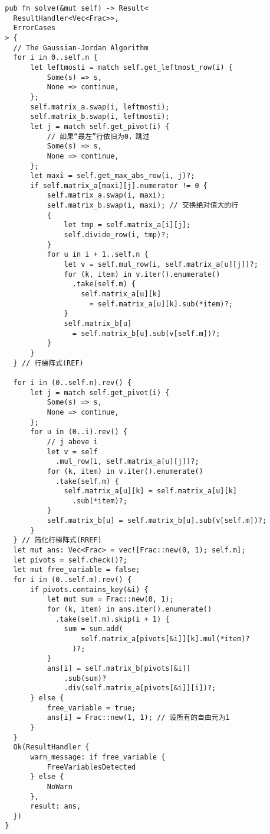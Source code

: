 \documentclass[1pt]{article}
\begin{document}
        \begin{lstlisting}
        pub fn solve(&mut self) -> Result<
          ResultHandler<Vec<Frac>>,
          ErrorCases
        > {
          // The Gaussian-Jordan Algorithm
          for i in 0..self.n {
              let leftmosti = match self.get_leftmost_row(i) {
                  Some(s) => s,
                  None => continue,
              };
              self.matrix_a.swap(i, leftmosti);
              self.matrix_b.swap(i, leftmosti);
              let j = match self.get_pivot(i) {
                  // 如果“最左”行依旧为0，跳过
                  Some(s) => s,
                  None => continue,
              };
              let maxi = self.get_max_abs_row(i, j)?;
              if self.matrix_a[maxi][j].numerator != 0 {
                  self.matrix_a.swap(i, maxi);
                  self.matrix_b.swap(i, maxi); // 交换绝对值大的行
                  {
                      let tmp = self.matrix_a[i][j];
                      self.divide_row(i, tmp)?;
                  }
                  for u in i + 1..self.n {
                      let v = self.mul_row(i, self.matrix_a[u][j])?;
                      for (k, item) in v.iter().enumerate()
                        .take(self.m) {
                          self.matrix_a[u][k]
                            = self.matrix_a[u][k].sub(*item)?;
                      }
                      self.matrix_b[u]
                        = self.matrix_b[u].sub(v[self.m])?;
                  }
              }
          } // 行梯阵式(REF)

          for i in (0..self.n).rev() {
              let j = match self.get_pivot(i) {
                  Some(s) => s,
                  None => continue,
              };
              for u in (0..i).rev() {
                  // j above i
                  let v = self
                    .mul_row(i, self.matrix_a[u][j])?;
                  for (k, item) in v.iter().enumerate()
                    .take(self.m) {
                      self.matrix_a[u][k] = self.matrix_a[u][k]
                        .sub(*item)?;
                  }
                  self.matrix_b[u] = self.matrix_b[u].sub(v[self.m])?;
              }
          } // 简化行梯阵式(RREF)
          let mut ans: Vec<Frac> = vec![Frac::new(0, 1); self.m];
          let pivots = self.check()?;
          let mut free_variable = false;
          for i in (0..self.m).rev() {
              if pivots.contains_key(&i) {
                  let mut sum = Frac::new(0, 1);
                  for (k, item) in ans.iter().enumerate()
                    .take(self.m).skip(i + 1) {
                      sum = sum.add(
                          self.matrix_a[pivots[&i]][k].mul(*item)?
                        )?;
                  }
                  ans[i] = self.matrix_b[pivots[&i]]
                      .sub(sum)?
                      .div(self.matrix_a[pivots[&i]][i])?;
              } else {
                  free_variable = true;
                  ans[i] = Frac::new(1, 1); // 设所有的自由元为1
              }
          }
          Ok(ResultHandler {
              warn_message: if free_variable {
                  FreeVariablesDetected
              } else {
                  NoWarn
              },
              result: ans,
          })
        }
        \end{lstlisting}
  \newpage
\end{document}
